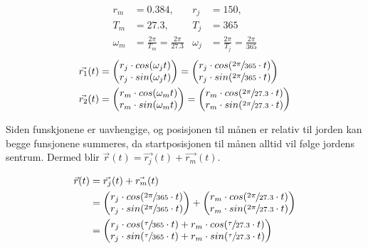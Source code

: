 \documentclass{../../myassignment}
\begin{document}
	\begin{answer}
		\begin{align*}
			r_m &= 0.384, &r_j &= 150, \\
			T_m &= 27.3, &T_j &= 365 \\
			\omega_m &= \frac{2\pi}{T_{m}} = \frac{2\pi}{27.3} & \omega_j &= \frac{2\pi}{T_{j}} = \frac{2\pi}{365}
		\end{align*}
		\begin{align*}
			\vec{r_1}(t) &= \begin{pmatrix} r_j\cdot cos(\omega_j t)\\r_j \cdot sin(\omega_j t) \end{pmatrix} = \begin{pmatrix} r_j\cdot cos(\sfrac{2\pi}{365} \cdot t)\\r_j \cdot sin(\sfrac{2\pi}{365} \cdot t) \end{pmatrix}\\
			\vec{r_2}(t) &= \begin{pmatrix} r_m\cdot cos(\omega_m t)\\r_m \cdot sin(\omega_m t) \end{pmatrix} = \begin{pmatrix} r_m\cdot cos(\sfrac{2\pi}{27.3} \cdot t)\\r_m \cdot sin(\sfrac{2\pi}{27.3} \cdot t) \end{pmatrix}\\
		\end{align*}

		Siden funskjonene er uavhengige, og posisjonen til m{\aa}nen er relativ til jorden kan begge funsjonene summeres, da startposisjonen til m{\aa}nen alltid vil f{\o}lge jordens sentrum. Dermed blir $\vec{r}(t) = \vec{r_j}(t) + \vec{r_m}(t)$.

		\begin{align*}
			\vec{r}(t) &= \vec{r_j}(t) + \vec{r_m}(t) \\
			 &= \begin{pmatrix} r_j\cdot cos(\sfrac{2\pi}{365} \cdot t)\\r_j \cdot sin(\sfrac{2\pi}{365} \cdot t) \end{pmatrix} + \begin{pmatrix} r_m\cdot cos(\sfrac{2\pi}{27.3} \cdot t)\\r_m \cdot sin(\sfrac{2\pi}{27.3} \cdot t) \end{pmatrix} \\
			 &= \begin{pmatrix} r_j\cdot cos(\sfrac{\tau}{365} \cdot t) + r_m\cdot cos(\sfrac{\tau}{27.3} \cdot t) \\ r_j \cdot sin(\sfrac{\tau}{365} \cdot t) + r_m \cdot sin(\sfrac{\tau}{27.3} \cdot t) \end{pmatrix} \\
		\end{align*}

	\end{answer}
	
\end{document}

